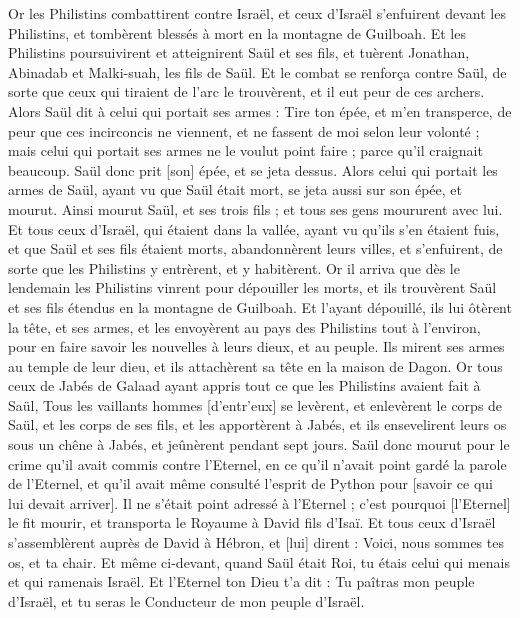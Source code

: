 \begin{multicols}{2}
\VerseOne{}Or les Philistins combattirent contre Israël, et ceux d'Israël s'enfuirent devant les Philistins, et tombèrent blessés à mort en la montagne de Guilboah.
Et les Philistins poursuivirent et atteignirent Saül et ses fils, et tuèrent Jonathan, Abinadab et Malki-suah, les fils de Saül.
Et le combat se renforça contre Saül, de sorte que ceux qui tiraient de l'arc le trouvèrent, et il eut peur de ces archers.
Alors Saül dit à celui qui portait ses armes : Tire ton épée, et m'en transperce, de peur que ces incirconcis ne viennent, et ne fassent de moi selon leur volonté ; mais celui qui portait ses armes ne le voulut point faire ; parce qu'il craignait beaucoup. Saül donc prit [son] épée, et se jeta dessus.
Alors celui qui portait les armes de Saül, ayant vu que Saül était mort, se jeta aussi sur son épée, et mourut.
Ainsi mourut Saül, et ses trois fils ; et tous ses gens moururent avec lui.
Et tous ceux d'Israël, qui étaient dans la vallée, ayant vu qu'ils s'en étaient fuis, et que Saül et ses fils étaient morts, abandonnèrent leurs villes, et s'enfuirent, de sorte que les Philistins y entrèrent, et y habitèrent.
Or il arriva que dès le lendemain les Philistins vinrent pour dépouiller les morts, et ils trouvèrent Saül et ses fils étendus en la montagne de Guilboah.
Et l'ayant dépouillé, ils lui ôtèrent la tête, et ses armes, et les envoyèrent au pays des Philistins tout à l'environ, pour en faire savoir les nouvelles à leurs dieux, et au peuple.
Ils mirent ses armes au temple de leur dieu, et ils attachèrent sa tête en la maison de Dagon.
Or tous ceux de Jabés de Galaad ayant appris tout ce que les Philistins avaient fait à Saül,
Tous les vaillants hommes [d'entr'eux] se levèrent, et enlevèrent le corps de Saül, et les corps de ses fils, et les apportèrent à Jabés, et ils ensevelirent leurs os sous un chêne à Jabés, et jeûnèrent pendant sept jours.
Saül donc mourut pour le crime qu'il avait commis contre l'Eternel, en ce qu'il n'avait point gardé la parole de l'Eternel, et qu'il avait même consulté l'esprit de Python pour [savoir ce qui lui devait arriver].
Il ne s'était point adressé à l'Eternel ; c'est pourquoi [l'Eternel] le fit mourir, et transporta le Royaume à David fils d'Isaï.
\VerseOne{}Et tous ceux d'Israël s'assemblèrent auprès de David à Hébron, et [lui] dirent : Voici, nous sommes tes os, et ta chair.
Et même ci-devant, quand Saül était Roi, tu étais celui qui menais et qui ramenais Israël. Et l'Eternel ton Dieu t'a dit : Tu paîtras mon peuple d'Israël, et tu seras le Conducteur de mon peuple d'Israël.

\end{multicols}
